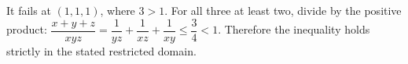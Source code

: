 It fails at $(1,1,1)$, where $3>1$. For all three at least two, divide by the positive product: $\dfrac{x+y+z}{xyz}=\dfrac{1}{yz}+\dfrac{1}{xz}+\dfrac{1}{xy}\le\dfrac{3}{4}<1$. Therefore the inequality holds strictly in the stated restricted domain.
